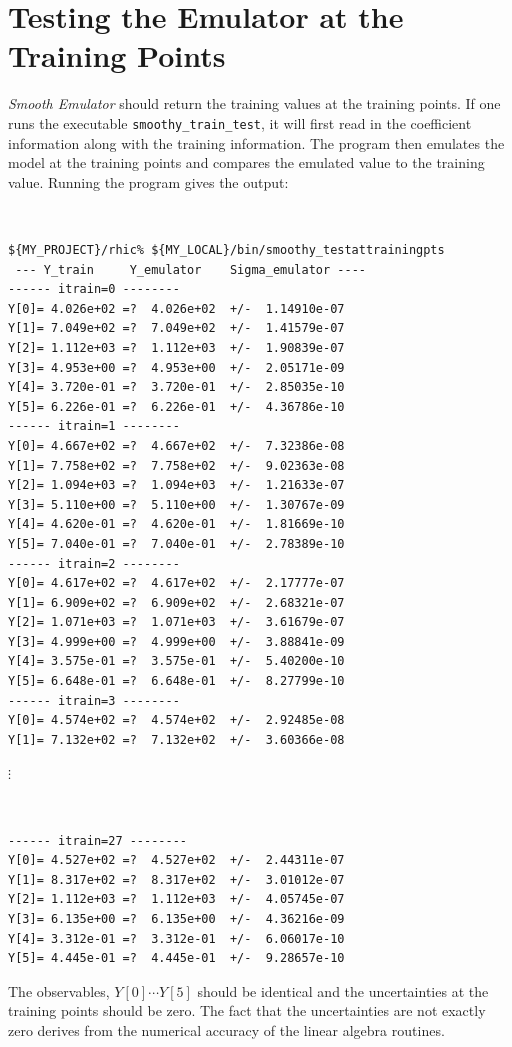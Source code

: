 \documentclass[UserManual.tex]{subfiles}
\begin{document}
\section{Testing the Emulator at the Training Points}
{\it Smooth Emulator} should return the training values at the training points. If one runs the executable {\tt smoothy\_train\_test}, it will first read in the coefficient information along with the training information. The program then emulates the model at the training points and compares the emulated value to the training value. Running the program gives the output:
{\tt
\begin{verbatim}
${MY_PROJECT}/rhic% ${MY_LOCAL}/bin/smoothy_testattrainingpts
 --- Y_train     Y_emulator    Sigma_emulator ----
------ itrain=0 --------
Y[0]= 4.026e+02 =?  4.026e+02  +/-  1.14910e-07
Y[1]= 7.049e+02 =?  7.049e+02  +/-  1.41579e-07
Y[2]= 1.112e+03 =?  1.112e+03  +/-  1.90839e-07
Y[3]= 4.953e+00 =?  4.953e+00  +/-  2.05171e-09
Y[4]= 3.720e-01 =?  3.720e-01  +/-  2.85035e-10
Y[5]= 6.226e-01 =?  6.226e-01  +/-  4.36786e-10
------ itrain=1 --------
Y[0]= 4.667e+02 =?  4.667e+02  +/-  7.32386e-08
Y[1]= 7.758e+02 =?  7.758e+02  +/-  9.02363e-08
Y[2]= 1.094e+03 =?  1.094e+03  +/-  1.21633e-07
Y[3]= 5.110e+00 =?  5.110e+00  +/-  1.30767e-09
Y[4]= 4.620e-01 =?  4.620e-01  +/-  1.81669e-10
Y[5]= 7.040e-01 =?  7.040e-01  +/-  2.78389e-10
------ itrain=2 --------
Y[0]= 4.617e+02 =?  4.617e+02  +/-  2.17777e-07
Y[1]= 6.909e+02 =?  6.909e+02  +/-  2.68321e-07
Y[2]= 1.071e+03 =?  1.071e+03  +/-  3.61679e-07
Y[3]= 4.999e+00 =?  4.999e+00  +/-  3.88841e-09
Y[4]= 3.575e-01 =?  3.575e-01  +/-  5.40200e-10
Y[5]= 6.648e-01 =?  6.648e-01  +/-  8.27799e-10
------ itrain=3 --------
Y[0]= 4.574e+02 =?  4.574e+02  +/-  2.92485e-08
Y[1]= 7.132e+02 =?  7.132e+02  +/-  3.60366e-08
\end{verbatim}}
$\vdots$\\
{\tt
\begin{verbatim}
------ itrain=27 --------
Y[0]= 4.527e+02 =?  4.527e+02  +/-  2.44311e-07
Y[1]= 8.317e+02 =?  8.317e+02  +/-  3.01012e-07
Y[2]= 1.112e+03 =?  1.112e+03  +/-  4.05745e-07
Y[3]= 6.135e+00 =?  6.135e+00  +/-  4.36216e-09
Y[4]= 3.312e-01 =?  3.312e-01  +/-  6.06017e-10
Y[5]= 4.445e-01 =?  4.445e-01  +/-  9.28657e-10
\end{verbatim}}

The observables, $Y[0]\cdots Y[5]$ should be identical and the uncertainties at the training points should be zero. The fact that the uncertainties are not exactly zero derives from the numerical accuracy of the linear algebra routines.
\end{document}

